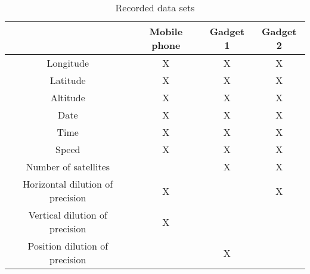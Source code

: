 \documentclass{article}
\begin{document}
			\begin{table}[h]
				\centering
				\begin{tabular}{|c|c|c|c|}
					\hline 
					& Mobile phone & Gadget 1 & Gadget 2 \\ 
					\hline 
					Longitude & X & X & X \\ 
					\hline 
					Latitude & X & X & X \\ 
					\hline 
					Altitude & X & X & X \\ 
					\hline 
					Date & X & X & X \\ 
					\hline 
					Time & X & X & X \\ 
					\hline 
					Speed & X & X & X \\ 
					\hline 
					Number of satellites & & X & X \\ 
					\hline 
					Horizontal dilution of precision & X & & X \\ 
					\hline 
					Vertical dilution of precision & X & & \\
					\hline 
					Position dilution of precision & & X &  \\ 
					\hline 
				\end{tabular} 
				\caption{Recorded data sets}
				\label{table:datasets}
			\end{table}
\end{document}
